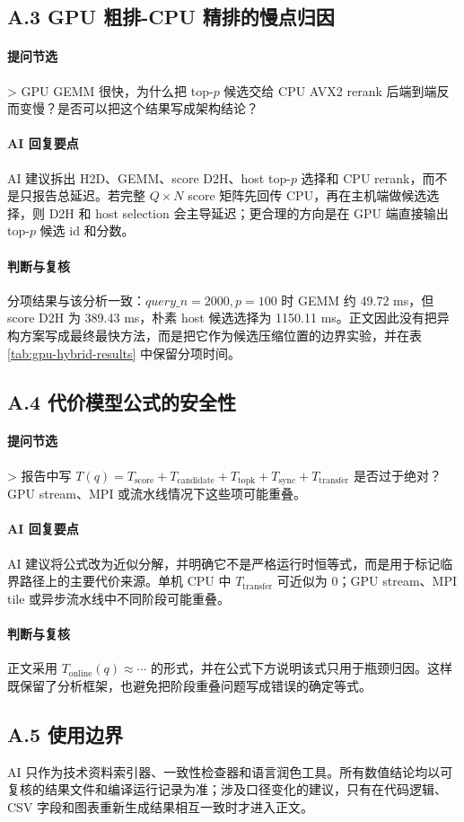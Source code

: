 \documentclass[a4paper,11pt,UTF8]{ctexart}
\begin{document}
\subsection*{A.3 GPU 粗排-CPU 精排的慢点归因}

\paragraph{提问节选}

> GPU GEMM 很快，为什么把 top-$p$ 候选交给 CPU AVX2 rerank 后端到端反而变慢？是否可以把这个结果写成架构结论？

\paragraph{AI 回复要点}

AI 建议拆出 H2D、GEMM、score D2H、host top-$p$ 选择和 CPU rerank，而不是只报告总延迟。若完整 $Q\times N$ score 矩阵先回传 CPU，再在主机端做候选选择，则 D2H 和 host selection 会主导延迟；更合理的方向是在 GPU 端直接输出 top-$p$ 候选 id 和分数。

\paragraph{判断与复核}

分项结果与该分析一致：$query\_n=2000,p=100$ 时 GEMM 约 49.72 ms，但 score D2H 为 389.43 ms，朴素 host 候选选择为 1150.11 ms。正文因此没有把异构方案写成最终最快方法，而是把它作为候选压缩位置的边界实验，并在表 \ref{tab:gpu-hybrid-results} 中保留分项时间。

\subsection*{A.4 代价模型公式的安全性}

\paragraph{提问节选}

> 报告中写 $T(q)=T_{\mathrm{score}}+T_{\mathrm{candidate}}+T_{\mathrm{topk}}+T_{\mathrm{sync}}+T_{\mathrm{transfer}}$ 是否过于绝对？GPU stream、MPI 或流水线情况下这些项可能重叠。

\paragraph{AI 回复要点}

AI 建议将公式改为近似分解，并明确它不是严格运行时恒等式，而是用于标记临界路径上的主要代价来源。单机 CPU 中 $T_{\mathrm{transfer}}$ 可近似为 0；GPU stream、MPI tile 或异步流水线中不同阶段可能重叠。

\paragraph{判断与复核}

正文采用 $T_{\mathrm{online}}(q)\approx\cdots$ 的形式，并在公式下方说明该式只用于瓶颈归因。这样既保留了分析框架，也避免把阶段重叠问题写成错误的确定等式。

\subsection*{A.5 使用边界}

AI 只作为技术资料索引器、一致性检查器和语言润色工具。所有数值结论均以可复核的结果文件和编译运行记录为准；涉及口径变化的建议，只有在代码逻辑、CSV 字段和图表重新生成结果相互一致时才进入正文。
\end{document}
